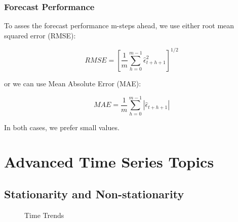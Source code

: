 \documentclass[11pt]{article}
\begin{document}
\subsubsection{Forecast Performance}

To asses the forecast performance m-steps ahead, we use either root mean squared error (RMSE):
\begin{mdframed}
    \begin{equation}
        \label{forecast rmse}
        RMSE = \left[ \dfrac{1}{m}\sum_{h=0}^{m-1} \hat{\epsilon}^2_{t+h+1}\right]^{1/2}
    \end{equation}
\end{mdframed}

or we can use Mean Absolute Error (MAE):
\begin{mdframed}
    \begin{equation}
        \label{mean absolute error mae}
        MAE = \dfrac{1}{m}\sum_{h=0}^{m-1}|\hat{\epsilon}_{t+h+1}|
    \end{equation}
\end{mdframed}
In both cases, we prefer small values.

\section{Advanced Time Series Topics}

\subsection{Stationarity and Non-stationarity}

\begin{figure}[h]
    \centering
    \qquad
    \caption{Time Trends}%
    \label{fig:trends}%
\end{figure}
\end{document}
